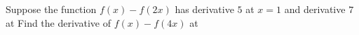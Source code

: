 Suppose the function $f(x)-f(2x)$ has derivative $5$ at $x=1$ and derivative $7$ at  Find the derivative of $f(x)-f(4x)$ at 